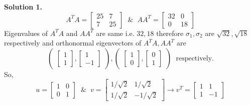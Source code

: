 \documentclass[a4paper,11pt]{article}
\numberwithin{equation}{section}
\begin{document}
\begin{itemize}
\textbf{Solution 1.}
\[
A^TA=\begin{bmatrix}
    25&7\\7&25
\end{bmatrix} \hspace{7pt} \& \hspace{7pt} AA^T=\begin{bmatrix}
    32&0\\0&18
\end{bmatrix} 
\]
Eigenvalues of $A^TA$ and $AA^T$ are same i.e. $32,18$ therefore $\sigma_1,\sigma_2$ are $\sqrt{32},\sqrt{18}$ respectively and orthonormal eigenvectors of
$A^TA,AA^T$  are 
\[\begin{pmatrix}
    \begin{bmatrix}
        1\\1
    \end{bmatrix},\begin{bmatrix}
        1\\-1
    \end{bmatrix}
\end{pmatrix},\begin{pmatrix}
    \begin{bmatrix}
        1\\0
    \end{bmatrix},\begin{bmatrix}
        0\\1
    \end{bmatrix}
\end{pmatrix} \hspace{7pt} \text{respectively.}
\] So,
\[
u=\begin{bmatrix}
    1&0\\0&1
\end{bmatrix} \hspace{7pt} \& \hspace{7pt} v=
    \begin{bmatrix}
        {1}/{\sqrt{2}}&{1}/{\sqrt{2}}\\
        {1}/{\sqrt{2}}&-{1}/{\sqrt{2}}
    \end{bmatrix}\longrightarrow v^T=\begin{bmatrix}
        1&1\\
        1&-1
    \end{bmatrix}
\]


\end{itemize}
\end{document}
